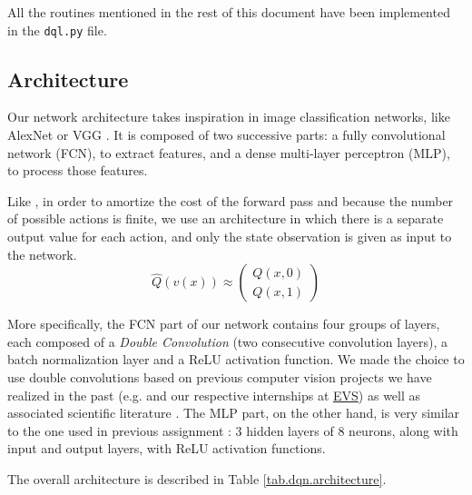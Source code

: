 \documentclass[a4paper, 12pt]{article}
\begin{document}
    \begin{note}
        All the routines mentioned in the rest of this document have been implemented in the \texttt{dql.py} file.
    \end{note}
    
    \subsection{Architecture}
    
    Our network architecture takes inspiration in image classification networks, like AlexNet \cite{krizhevsky2012imagenet} or VGG \cite{simonyan2014very}. It is composed of two successive parts: a fully convolutional network (FCN), to extract features, and a dense multi-layer perceptron (MLP), to process those features.
    
    Like \textcite{mnih2013playing}, in order to amortize the cost of the forward pass and because the number of possible actions is finite, we use an architecture in which there is a separate output value for each action, and only the state observation is given as input to the network.
    \begin{equation}
        \hat{Q}(v(x)) \approx \begin{pmatrix} Q(x, 0) \\ Q(x, 1) \end{pmatrix}
    \end{equation}
    
    More specifically, the FCN part of our network contains four groups of layers, each composed of a \emph{Double Convolution} (two consecutive convolution layers), a batch normalization layer and a ReLU activation function. We made the choice to use double convolutions based on previous computer vision projects we have realized in the past (e.g. \cite{rozet2020adopptrs} and our respective internships at \href{https://evs.com/}{EVS}) as well as associated scientific literature \cite{sha2020end, ronneberger2015u}. The MLP part, on the other hand, is very similar to the one used in previous assignment : 3 hidden layers of 8 neurons, along with input and output layers, with ReLU activation functions.
    
    The overall architecture is described in Table \ref{tab.dqn.architecture}.
    
\end{document}
